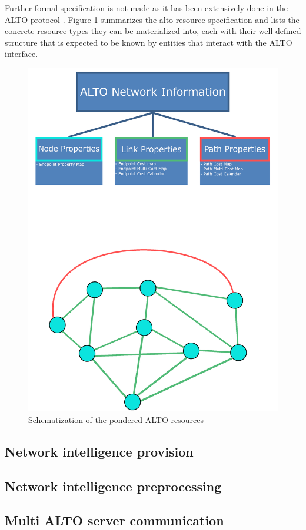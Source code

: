 
Further formal specification is not made as it has been extensively done in the ALTO protocol \cite{alto-protocol}. Figure \ref{fig:alto-resources} summarizes the alto resource specification and lists the concrete resource types they can be materialized into, each with their well defined structure that is expected to be known by entities that interact with the ALTO interface.

\begin{figure}[!h]
        \centering
        \includegraphics[scale=0.80]{img/architecture-resources.png}
        \caption{Schematization of the pondered ALTO resources}
        \label{fig:alto-resources}
\end{figure}

\subsection{Network intelligence provision}

\subsection{Network intelligence preprocessing}

\subsection{Multi ALTO server communication}
\label{ssec:multi-alto}

